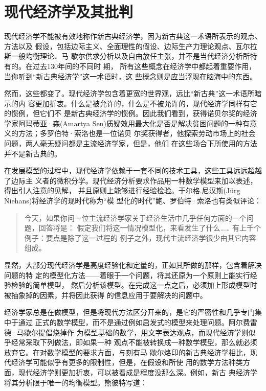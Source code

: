 \part{现代经济学及其批判}

现代经济学不能被有效地称作新古典经济学，因为新古典这一术语所表示的观点、方法以及
假设，包括边际主义、全面理性的假设、边际生产力理论观点、瓦尔拉斯一般均衡理论、马
歇尔供求分析以及自由放任主张，并不是当代经济分析所特有的。在过去130年间的不同时
期， 所有这些概念在经济学中都起着重要作用，当你听到“新古典经济学”这一术语时，这
些概念则是应当浮现在脑海中的东西。

然而，这些都变了。现代经济学包含着更宽的世界观，远比“新古典”这一术语所暗示的内
容更加折衷。什么是被允许的，什么是不被允许的，现代经济学同样有它的惯例，但它们不
是新古典经济学的惯例。因此我们看到，获得诺贝尔奖的经济学家阿玛蒂亚·森(Amartya
Sen)质疑效用最大化是否是解决贫困问题的一种有意义的方法；多罗伯特·索洛也是一位诺贝
尔奖获得者，他探索劳动市场上的社会问题，两人毫无疑问都是主流经济学家，但是，他们
在这些场合下所使用的方法并不是新古典的。

在发展模型的过程中，现代经济学依赖于一套不同的技术工具，这些工具远远超越了边际主
义者的微积分学。现代经济分析要求作品用一种数学模型来加以表述，得出引人注意的见解，
并且原则上能够进行经验检验。于尔格.尼汉斯(J\"urg Niehans)将经济学的现时代称为“模
型化的时代”鲍、罗伯特·索洛也有类似评论：

\begin{quotation}
  今天，如果你问一位主流经济学家关于经济生活中几乎任何方面的一个问题，回答将是：
  假定我们将这一情况模型化，来看发生了什么…… 有上千个例子：要点是除了这一过程的
  例子之外，现代主流经济学很少由其它内容组成。
\end{quotation}

显然，大部分现代经济学是高度经验化和定量的，正如其所做的那样，包含着解决问题的特
定的模型化方法——着眼于一个问题，将其还原为一个原则上能实行经验检验的简单模型，
然后分析该模型。在完成这一点之后，必须加上形成模型时被抽象掉的因素，并将因此获得
的信息应用于要解决的问题中。

经济学家总是在做模型，但是将现代方法区分开来的，是它的严密性和几乎专门集中于通过
正式的数学模型，而不是通过例如启发式的模型来处理问题。阿尔费雷德·马歇尔提倡烧掉作
为模型基础的数学，用文字表达观点，而现代经济学则似乎经常采取下列做法，即如果一种
观点不能被转换成一种数学模型，那么就必须放弃它。在对数学模型的要求方面，与刻有马
歇尔烙印的新古典经济学相比，现代经济学可能似乎有更多的限制性，但是，在假设和所使
用的数学方法种类方面，现代经济学则更加折衷，可以被看成是程度没那么深。例如，新古
典经济学将其分析限于唯一的均衡模型。熊彼特写道：


